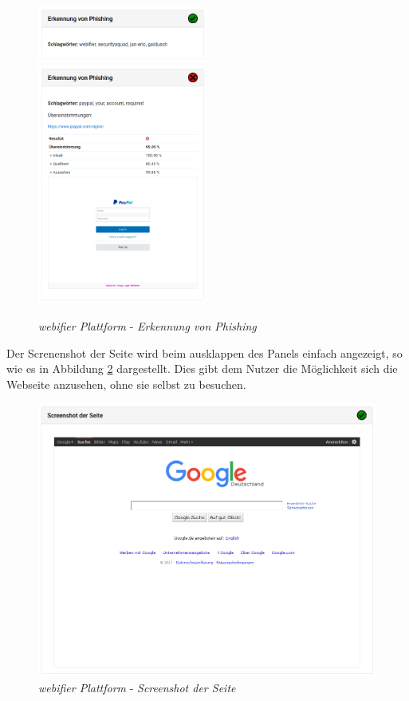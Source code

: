 \begin{figure}[H]
\centerline{%
\includegraphics[width=0.5\textwidth]{images/platform/phishing-clean}%
\includegraphics[width=0.5\textwidth]{images/platform/phishing-malicious}%
}%
\caption{\textit{webifier Plattform} - \textit{Erkennung von Phishing}}
\label{fig:platform-result-phishingdetector}
\end{figure}

\newpage

Der Screnenshot der Seite wird beim ausklappen des Panels einfach angezeigt, so wie es in Abbildung \ref{fig:platform-result-screenshot} dargestellt. Dies gibt dem Nutzer die Möglichkeit sich die Webseite anzusehen, ohne sie selbst zu besuchen.

\begin{figure}[H]
  \centering
  \includegraphics[width=\textwidth]{images/platform/screenshot-clean}
  \caption{\textit{webifier Plattform} - \textit{Screenshot der Seite}}
  \label{fig:platform-result-screenshot}
\end{figure}

